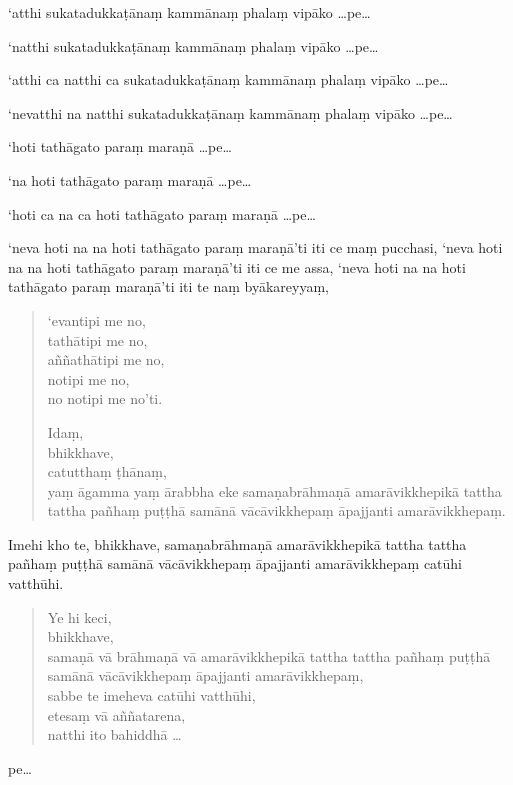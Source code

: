 \documentclass[11pt,twoside,openright]{book}
\begin{document}
\pstart
‘atthi sukatadukkaṭānaṃ kammānaṃ phalaṃ vipāko …pe…
\pend

\pstart
‘natthi sukatadukkaṭānaṃ kammānaṃ phalaṃ vipāko …pe…
\pend

\pstart
‘atthi ca natthi ca sukatadukkaṭānaṃ kammānaṃ phalaṃ vipāko …pe…
\pend

\pstart
‘nevatthi na natthi sukatadukkaṭānaṃ kammānaṃ phalaṃ vipāko …pe…
\pend

\pstart
‘hoti tathāgato paraṃ maraṇā …pe…
\pend

\pstart
‘na hoti tathāgato paraṃ maraṇā …pe…
\pend

\pstart
‘hoti ca na ca hoti tathāgato paraṃ maraṇā …pe…
\pend

\pstart
‘neva hoti na na hoti tathāgato paraṃ maraṇā’ti iti ce maṃ pucchasi, ‘neva hoti na na hoti tathāgato paraṃ maraṇā’ti iti ce me assa, ‘neva hoti na na hoti tathāgato paraṃ maraṇā’ti iti te naṃ byākareyyaṃ,
\pend

\begin{verse}
‘evantipi me no,\\
\vin  tathātipi me no,\\
\vin  aññathātipi me no,\\
\vin  notipi me no,\\
\vin  no notipi me no’ti.

Idaṃ,\\
\vin  bhikkhave,\\
\vin  catutthaṃ ṭhānaṃ,\\
\vin  yaṃ āgamma yaṃ ārabbha eke samaṇabrāhmaṇā amarāvikkhepikā tattha tattha pañhaṃ puṭṭhā samānā vācāvikkhepaṃ āpajjanti amarāvikkhepaṃ.

\end{verse}
\pstart
Imehi kho te, bhikkhave, samaṇabrāhmaṇā amarāvikkhepikā tattha tattha pañhaṃ puṭṭhā samānā vācāvikkhepaṃ āpajjanti amarāvikkhepaṃ catūhi vatthūhi.
\pend

\begin{verse}
Ye hi keci,\\
\vin  bhikkhave,\\
\vin  samaṇā vā brāhmaṇā vā amarāvikkhepikā tattha tattha pañhaṃ puṭṭhā samānā vācāvikkhepaṃ āpajjanti amarāvikkhepaṃ,\\
\vin  sabbe te imeheva catūhi vatthūhi,\\
\vin  etesaṃ vā aññatarena,\\
\vin  natthi ito bahiddhā …

\end{verse}
\pstart
pe…
\pend
\end{document}
